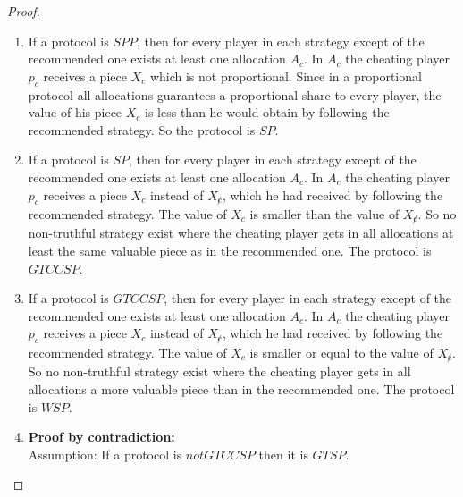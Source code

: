 \begin{proof}
\textcolor{white}{x}
\begin{enumerate}
\item If a protocol is $SPP$, then for every player in each strategy except of the recommended one exists at least one allocation $A_c$. In $A_c$ the cheating player $p_c$ receives a piece $X_c$ which is not proportional. Since in a proportional protocol all allocations guarantees a proportional share to every player, the value of his piece $X_c$ is less than he would obtain by following the recommended strategy. So the protocol is $SP$.   
\item If a protocol is $SP$, then for every player in each strategy except of the recommended one exists at least one allocation $A_c$. In $A_c$ the cheating player $p_c$ receives a piece $X_{c}$ instead of $X_{\not c}$, which he had received by following the recommended strategy. The value of $X_c$ is smaller than the value of $X_{\not c}$. So no non-truthful strategy exist where the cheating player gets in all allocations at least the same valuable piece as in the recommended one. The protocol is $GTCCSP$.
\item If a protocol is $GTCCSP$, then for every player in each strategy except of the recommended one exists at least one allocation $A_c$. In $A_c$ the cheating player $p_c$ receives a piece $X_{c}$ instead of $X_{\not c}$, which he had received by following the recommended strategy. The value of $X_c$ is smaller or equal to the value of $X_{\not c}$. So no non-truthful strategy exist where the cheating player gets in all allocations a more valuable piece than in the recommended one. The protocol is $WSP$.
\item \textbf{Proof by contradiction:}\\
\newline
Assumption: If a protocol is $notGTCCSP$ then it is $GTSP$.\\

\end{enumerate}
\end{proof}
